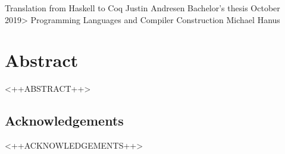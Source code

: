 \documentclass[10pt]{book}
\begin{document}
\frontmatter

\studtitlepage%
  {Translation from Haskell to Coq}
  {}%
  {Justin Andresen}%
  {Bachelor's thesis}%
  {October 2019>}%
  {Programming Languages and Compiler Construction}%
  {Michael Hanus}
\cleardoublepage
\eidesstatt

\chapter*{Abstract}
<++ABSTRACT++>

\section*{Acknowledgements}
<++ACKNOWLEDGEMENTS++>

\tableofcontents
\mainmatter







\appendix

\backmatter
\nocite{*} %
\tocbibliography
\end{document}
